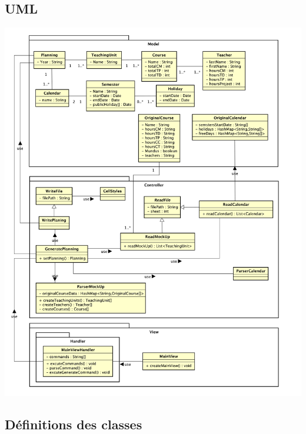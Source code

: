 \documentclass{polytech/polytech}
\begin{document}
	\subsection{UML}
	\includegraphics[scale=0.2]{./img/Diagram.png}
	\pagebreak

	\subsection{Définitions des classes}
\end{document}
